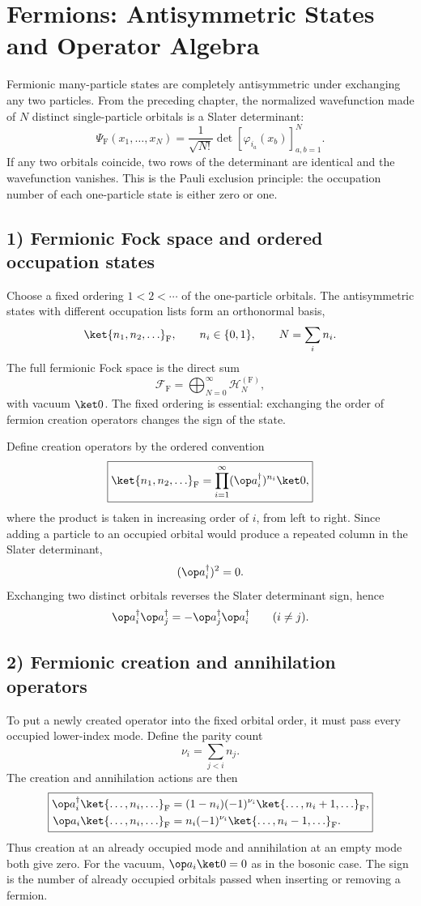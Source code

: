 \section{Fermions: Antisymmetric States and Operator Algebra}

Fermionic many-particle states are completely antisymmetric under exchanging any two particles. From the preceding chapter, the normalized wavefunction made of $N$ distinct single-particle orbitals is a Slater determinant:
\[\Psi_{\mathrm F}(x_1,\ldots,x_N)
=\frac1{\sqrt{N!}}\det[\varphi_{i_a}(x_b)]_{a,b=1}^N.\]
If any two orbitals coincide, two rows of the determinant are identical and the wavefunction vanishes. This is the Pauli exclusion principle: the occupation number of each one-particle state is either zero or one.

\subsection*{1) Fermionic Fock space and ordered occupation states}

Choose a fixed ordering $1<2<\cdots$ of the one-particle orbitals. The antisymmetric states with different occupation lists form an orthonormal basis,
\[\ket{n_1,n_2,\ldots}_{\mathrm F},\qquad
n_i\in\{0,1\},\qquad N=\sum_i n_i.\]
The full fermionic Fock space is the direct sum
\[\mathcal F_{\mathrm F}=\bigoplus_{N=0}^\infty\mathcal H_N^{(\mathrm F)},\]
with vacuum $\ket0$. The fixed ordering is essential: exchanging the order of fermion creation operators changes the sign of the state.

Define creation operators by the ordered convention
\[\boxed{\ket{n_1,n_2,\ldots}_{\mathrm F}
=\prod_{i=1}^\infty(\op a_i^\dagger)^{n_i}\ket0,}\]
where the product is taken in increasing order of $i$, from left to right. Since adding a particle to an occupied orbital would produce a repeated column in the Slater determinant,
\[(\op a_i^\dagger)^2=0.\]
Exchanging two distinct orbitals reverses the Slater determinant sign, hence
\[\op a_i^\dagger\op a_j^\dagger=-\op a_j^\dagger\op a_i^\dagger
\qquad(i\ne j).\]

\subsection*{2) Fermionic creation and annihilation operators}

To put a newly created operator into the fixed orbital order, it must pass every occupied lower-index mode. Define the parity count
\[\nu_i=\sum_{j<i}n_j.\]
The creation and annihilation actions are then
\[\boxed{\begin{aligned}
\op a_i^\dagger\ket{\ldots,n_i,\ldots}_{\mathrm F}
 &=(1-n_i)(-1)^{\nu_i}\ket{\ldots,n_i+1,\ldots}_{\mathrm F},\\
\op a_i\ket{\ldots,n_i,\ldots}_{\mathrm F}
 &=n_i(-1)^{\nu_i}\ket{\ldots,n_i-1,\ldots}_{\mathrm F}.
\end{aligned}}\]
Thus creation at an already occupied mode and annihilation at an empty mode both give zero. For the vacuum, $\op a_i\ket0=0$ as in the bosonic case. The sign is the number of already occupied orbitals passed when inserting or removing a fermion.

